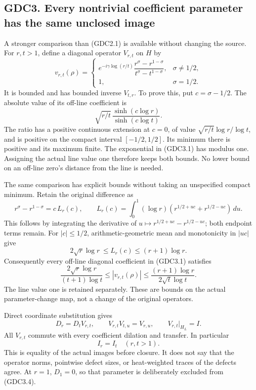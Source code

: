 \subsection{GDC3. Every nontrivial coefficient parameter has the same
unclosed
image}\label{gdc3.-every-nontrivial-coefficient-parameter-has-the-same-unclosed-image}

A stronger comparison than (GDC2.1) is available without changing the
source. For \(r,t>1\), define a diagonal operator \(V_{r,t}\) on \(H\)
by \[
v_{r,t}(\rho)=
\begin{cases}
e^{-i\gamma\log(r/t)}\dfrac{r^\sigma-r^{1-\sigma}}{t^\sigma-t^{1-\sigma}},&\sigma\ne1/2,\\
1,&\sigma=1/2.
\end{cases}
\tag{GDC3.1}
\] It is bounded and has bounded inverse \(V_{t,r}\). To prove this, put
\(c=\sigma-1/2\). The absolute value of its off-line coefficient is \[
\sqrt{r/t}\,\frac{\sinh(c\log r)}{\sinh(c\log t)}.
\tag{GDC3.2}
\] The ratio has a positive continuous extension at \(c=0\), of value
\(\sqrt{r/t}\log r/\log t\), and is positive on the compact interval
\([-1/2,1/2]\). Its minimum there is positive and its maximum finite.
The exponential in (GDC3.1) has modulus one. Assigning the actual line
value one therefore keeps both bounds. No lower bound on an off-line
zero's distance from the line is needed.

The same comparison has explicit bounds without taking an unspecified
compact minimum. Retain the original difference as \[
r^\sigma-r^{1-\sigma}=c\,L_r(c),\qquad
L_r(c)=\int_0^1(\log r)
\left(r^{1/2+uc}+r^{1/2-uc}\right)\,du.
\] This follows by integrating the derivative of
\(u\mapsto r^{1/2+uc}-r^{1/2-uc}\); both endpoint terms remain. For
\(|c|\le1/2\), arithmetic-geometric mean and monotonicity in \(|uc|\)
give \[
2\sqrt r\log r\ \le L_r(c)\le(r+1)\log r.
\] Consequently every off-line diagonal coefficient in (GDC3.1)
satisfies \[
\frac{2\sqrt r\log r}{(t+1)\log t}
\le |v_{r,t}(\rho)|
\le \frac{(r+1)\log r}{2\sqrt t\log t}.
\tag{GDC3.2a}
\] The line value one is retained separately. These are bounds on the
actual parameter-change map, not a change of the original operators.

Direct coordinate substitution gives \[
D_r=D_tV_{r,t},\qquad V_{r,t}V_{t,u}=V_{r,u},\qquad
V_{r,t}|_{H_L}=I.
\tag{GDC3.3}
\] All \(V_{r,t}\) commute with every coefficient dilation and transfer.
In particular \[
\boxed{I_r=I_t\quad(r,t>1).}
\tag{GDC3.4}
\] This is equality of the actual images before closure. It does not say
that the operator norms, pointwise defect sizes, or heat-weighted traces
of the defects agree. At \(r=1\), \(D_1=0\), so that parameter is
deliberately excluded from (GDC3.4).

